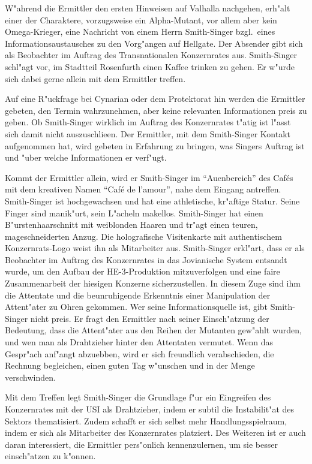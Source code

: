 
W"ahrend die Ermittler den ersten Hinweisen auf Valhalla nachgehen, erh"alt einer der Charaktere, vorzugsweise ein Alpha-Mutant, vor allem aber kein Omega-Krieger, eine Nachricht von einem Herrn Smith-Singer bzgl.~eines Informationsaustausches zu den Vorg"angen auf Hellgate. Der Absender gibt sich als Beobachter im Auftrag des Transnationalen Konzernrates aus. Smith-Singer schl"agt vor, im Stadtteil Rosenfurth einen Kaffee trinken zu gehen. Er w"urde sich dabei gerne allein mit dem Ermittler treffen. 

Auf eine R"uckfrage bei Cynarian oder dem Protektorat hin werden die Ermittler gebeten, den Termin wahrzunehmen, aber keine relevanten Informationen preis zu geben. Ob Smith-Singer wirklich im Auftrag des Konzernrates t"atig ist l"asst sich damit nicht auszuschlie\3en. Der Ermittler, mit dem Smith-Singer Kontakt aufgenommen hat, wird gebeten in Erfahrung zu bringen, was Singers Auftrag ist und "uber welche Informationen er verf"ugt. 

Kommt der Ermittler allein, wird er Smith-Singer im "`Au\3enbereich"' des Caf\'es mit dem kreativen Namen "`Caf\'e de l'amour"', nahe dem Eingang antreffen. Smith-Singer ist hochgewachsen und hat eine athletische, kr"aftige Statur. Seine Finger sind manik"urt, sein L"acheln makellos. Smith-Singer hat einen B"urstenhaarschnitt mit wei\3blonden Haaren und tr"agt einen teuren, ma\3geschneiderten Anzug. Die holografische Visitenkarte mit authentischem Konzernrats-Logo weist ihn als Mitarbeiter aus. Smith-Singer erkl"art, dass er als Beobachter im Auftrag des Konzernrates in das Jovianische System entsandt wurde, um den Aufbau der HE-3-Produktion mitzuverfolgen und eine faire Zusammenarbeit der hiesigen Konzerne sicherzustellen. In diesem Zuge sind ihm die Attentate und die beunruhigende Erkenntnis einer Manipulation der Attent"ater zu Ohren gekommen. Wer seine Informationsquelle ist, gibt Smith-Singer nicht preis. Er fragt den Ermittler nach seiner Einsch"atzung der Bedeutung, dass die Attent"ater aus den Reihen der Mutanten gew"ahlt wurden, und wen man als Drahtzieher hinter den Attentaten vermutet. Wenn das Gespr"ach anf"angt abzuebben, wird er sich freundlich verabschieden, die Rechnung begleichen, einen guten Tag w"unschen und in der Menge verschwinden.

Mit dem Treffen legt Smith-Singer die Grundlage f"ur ein Eingreifen des Konzernrates mit der USI als Drahtzieher, indem er subtil die Instabilit"at des Sektors thematisiert. Zudem schafft er sich selbst mehr Handlungsspielraum, indem er sich als Mitarbeiter des Konzernrates platziert. Des Weiteren ist er auch daran interessiert, die Ermittler pers"onlich kennenzulernen, um sie besser einsch"atzen zu k"onnen.


